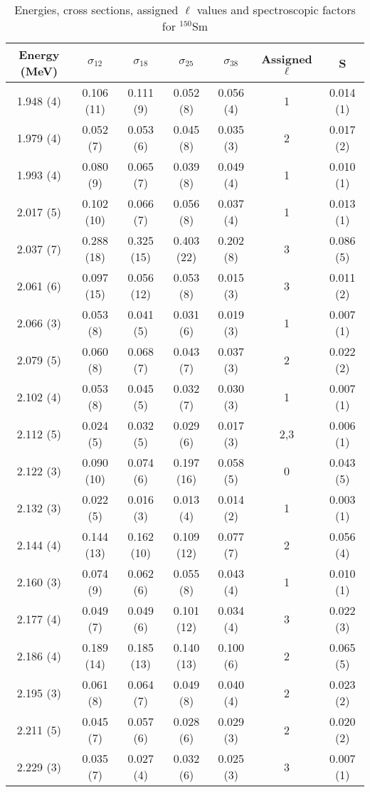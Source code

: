 \begin{table}
\caption{Energies, cross sections, assigned $\ell$ values and spectroscopic factors for $^{150}$Sm}
\begin{tabular}{c c c c c c c}
\hline \hline
Energy (MeV) & $\sigma_{12}$ & $\sigma_{18}$ & $\sigma_{25}$ & $\sigma_{38}$ & Assigned $\ell$ & S\\
\hline \hline
1.948 (4) & 0.106 (11) & 0.111 (9) & 0.052 (8) & 0.056 (4) & 1 & 0.014 (1) \\
1.979 (4) & 0.052 (7) & 0.053 (6) & 0.045 (8) & 0.035 (3) & 2 & 0.017 (2) \\
1.993 (4) & 0.080 (9) & 0.065 (7) & 0.039 (8) & 0.049 (4) & 1 & 0.010 (1) \\
2.017 (5) & 0.102 (10) & 0.066 (7) & 0.056 (8) & 0.037 (4) & 1 & 0.013 (1) \\
2.037 (7) & 0.288 (18) & 0.325 (15) & 0.403 (22) & 0.202 (8) & 3 & 0.086 (5) \\
2.061 (6) & 0.097 (15) & 0.056 (12) & 0.053 (8) & 0.015 (3) & 3 & 0.011 (2) \\
2.066 (3) & 0.053 (8) & 0.041 (5) & 0.031 (6) & 0.019 (3) & 1 & 0.007 (1) \\
2.079 (5) & 0.060 (8) & 0.068 (7) & 0.043 (7) & 0.037 (3) & 2 & 0.022 (2) \\
2.102 (4) & 0.053 (8) & 0.045 (5) & 0.032 (7) & 0.030 (3) & 1 & 0.007 (1) \\
2.112 (5) & 0.024 (5) & 0.032 (5) & 0.029 (6) & 0.017 (3) & 2,3 & 0.006 (1) \\
2.122 (3) & 0.090 (10) & 0.074 (6) & 0.197 (16) & 0.058 (5) & 0 & 0.043 (5) \\
2.132 (3) & 0.022 (5) & 0.016 (3) & 0.013 (4) & 0.014 (2) & 1 & 0.003 (1) \\
2.144 (4) & 0.144 (13) & 0.162 (10) & 0.109 (12) & 0.077 (7) & 2 & 0.056 (4) \\
2.160 (3) & 0.074 (9) & 0.062 (6) & 0.055 (8) & 0.043 (4) & 1 & 0.010 (1) \\
2.177 (4) & 0.049 (7) & 0.049 (6) & 0.101 (12) & 0.034 (4) & 3 & 0.022 (3) \\
2.186 (4) & 0.189 (14) & 0.185 (13) & 0.140 (13) & 0.100 (6) & 2 & 0.065 (5) \\
2.195 (3) & 0.061 (8) & 0.064 (7) & 0.049 (8) & 0.040 (4) & 2 & 0.023 (2) \\
2.211 (5) & 0.045 (7) & 0.057 (6) & 0.028 (6) & 0.029 (3) & 2 & 0.020 (2) \\
2.229 (3) & 0.035 (7) & 0.027 (4) & 0.032 (6) & 0.025 (3) & 3 & 0.007 (1) \\

\end{tabular}
\end{table}
